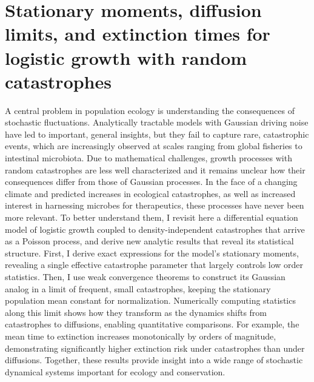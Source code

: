 



\def\reals{\mathbb{R}}
\def\be{\begin{equation}}
\def\ee{\end{equation}}
\def\bea{\begin{eqnarray}}
\def\eea{\end{eqnarray}}
\def\bml{\begin{mathletters}}
\def\eml{\end{mathletters}}
\def\bse{\begin{subequations}}
\def\ese{\end{subequations}}
\def\expec{\mathbb{E}}
\def\exp{\text{exp}}
\def\Var{\text{Var}}
\def\e{\text{e}}

\chapter{Stationary moments, diffusion limits, and extinction times for logistic growth with random catastrophes}



A central problem in population ecology is understanding the consequences of stochastic fluctuations.  Analytically tractable models with Gaussian driving noise have led to important, general insights, but they fail to capture rare, catastrophic events, which are increasingly observed at scales ranging from global fisheries to intestinal microbiota.  Due to mathematical challenges, growth processes with random catastrophes are less well characterized and it remains unclear how their consequences differ from those of Gaussian processes.  In the face of a changing climate and predicted increases in ecological catastrophes, as well as increased interest in harnessing microbes for therapeutics, these processes have never been more relevant.  To better understand them, I revisit here a differential equation model of logistic growth coupled to density-independent catastrophes that arrive as a Poisson process, and derive new analytic results that reveal its statistical structure.  First, I derive exact expressions for the model's stationary moments, revealing a single effective catastrophe parameter that largely controls low order statistics.  Then, I use weak convergence theorems to construct its Gaussian analog in a limit of frequent, small catastrophes, keeping the stationary population mean constant for normalization.  Numerically computing statistics along this limit shows how they transform as the dynamics shifts from catastrophes to diffusions, enabling quantitative comparisons.  For example, the mean time to extinction increases monotonically by orders of magnitude, demonstrating significantly higher extinction risk under catastrophes than under diffusions. Together, these results provide insight into a wide range of stochastic dynamical systems important for ecology and conservation.

